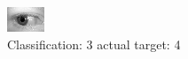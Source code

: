 \begin{figure}[h!]
\begin{center}
\includegraphics[width=0.60\columnwidth]{figures/ID738_class_3_target_4.png}
\end{center}
\caption{ Classification: 3 actual target: 4}
\label{fig:ID738_class_3_target_4}
\end{figure}

